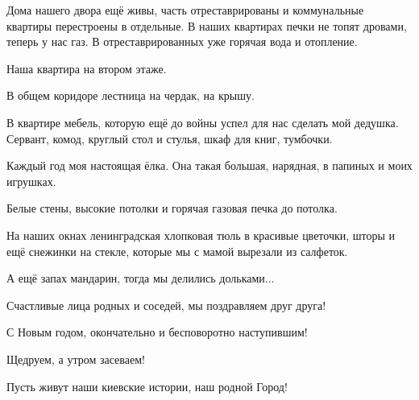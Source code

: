 Дома нашего двора ещё живы, часть отреставрированы и коммунальные квартиры
перестроены в отдельные. В наших квартирах печки не топят дровами, теперь у нас
газ. В отреставрированных уже горячая вода и отопление.

Наша квартира на втором этаже.

В общем коридоре лестница на чердак, на крышу. 


В квартире мебель, которую ещё до войны успел для нас сделать мой дедушка.
Сервант, комод, круглый стол и стулья, шкаф для книг, тумбочки.

Каждый год моя настоящая ёлка. Она такая большая, нарядная, в папиных и моих
игрушках.

Белые стены, высокие потолки и горячая газовая печка до потолка.

На наших окнах ленинградская хлопковая тюль в красивые цветочки, шторы и ещё
снежинки на стекле, которые мы с мамой вырезали из салфеток.

А ещё запах мандарин, тогда мы делились дольками...

Счастливые лица родных и соседей, мы поздравляем друг друга!

С Новым годом, окончательно и бесповоротно наступившим! 

Щедруем, а утром засеваем!

Пусть живут наши киевские истории, наш родной Город!

